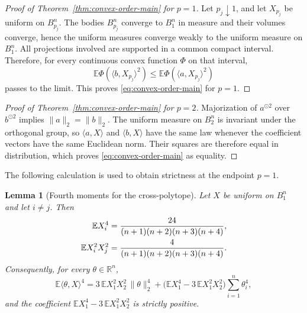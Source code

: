 \documentclass[pdflatex,sn-mathphys-num]{sn-jnl}
\numberwithin{equation}{section}
\theoremstyle{thmstyleone}
\newtheorem{lemma}[theorem]{Lemma}
\theoremstyle{thmstylethree}
\newcommand{\R}{\mathbb{R}}
\newcommand{\E}{\mathbb{E}}
\newcommand{\1}{\mathbf{1}}
\newcommand{\sqvec}[1]{#1^{\odot 2}}
\begin{document}
\begin{proof}[Proof of Theorem~\ref{thm:convex-order-main} for $p=1$]
Let $p_j\downarrow1$, and let $X_{p_j}$ be uniform on $B_{p_j}^n$.
The bodies $B_{p_j}^n$ converge to $B_1^n$ in measure and their volumes
converge, hence the uniform measures converge weakly to the uniform
measure on $B_1^n$. All projections involved are supported in a common
compact interval. Therefore, for every continuous convex function
$\Phi$ on that interval,
\[
 \E\Phi(\langle b,X_{p_j}\rangle^2)
 \le
 \E\Phi(\langle a,X_{p_j}\rangle^2)
\]
passes to the limit. This proves \eqref{eq:convex-order-main} for
$p=1$.
\end{proof}

\begin{proof}[Proof of Theorem~\ref{thm:convex-order-main} for $p=2$]
Majorization of $\sqvec a$ over $\sqvec b$ implies
$\|a\|_2=\|b\|_2$. The uniform measure on $B_2^n$ is invariant under
the orthogonal group, so $\langle a,X\rangle$ and
$\langle b,X\rangle$ have the same law whenever the coefficient
vectors have the same Euclidean norm. Their squares are therefore equal
in distribution, which proves \eqref{eq:convex-order-main} as equality.
\end{proof}

The following calculation is used to obtain strictness at the endpoint
$p=1$.

\begin{lemma}[Fourth moments for the cross-polytope]\label{lem:p1-fourth-moments}
Let $X$ be uniform on $B_1^n$ and let $i\neq j$. Then
\begin{align}\label{eq:p1-m4-m22}
 \E X_i^4
 &=\frac{24}{(n+1)(n+2)(n+3)(n+4)},\notag\\
 \E X_i^2X_j^2
 &=\frac{4}{(n+1)(n+2)(n+3)(n+4)}.
\end{align}
Consequently, for every $\theta\in\R^n$,
\begin{equation}\label{eq:p1-fourth-moment-projection}
 \E\langle\theta,X\rangle^4
 =
 3\,\E X_1^2X_2^2\,\|\theta\|_2^4
 +\bigl(\E X_1^4-3\,\E X_1^2X_2^2\bigr)
 \sum_{i=1}^n\theta_i^4,
\end{equation}
and the coefficient $\E X_1^4-3\,\E X_1^2X_2^2$ is strictly positive.
\end{lemma}
\end{document}
